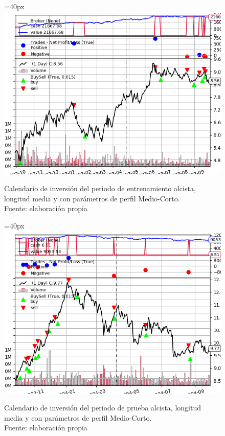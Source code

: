      	\begin{figure}[H]
     		\centering\leftskip=40px
     		\includegraphics[scale=0.66]{imagenes/M_Large-Medium_train.png}
     		\caption[Calendario de inversi\'on del periodo de entrenamiento largo.]{Calendario de inversi\'on del periodo de entrenamiento alcista, longitud media y con par\'ametros de perfil Medio-Corto.\\ Fuente: elaboraci\'on propia}
     		\label{fig:medium_period_mtrain}
     	\end{figure}
     	
     	\begin{figure}[H]
     		\centering\leftskip=40px
     		\includegraphics[scale=0.66]{imagenes/M_Large-Medium_test.png}
     		\caption[Calendario de inversi\'on del periodo de prueba medio]{Calendario de inversi\'on del periodo de prueba alcista, longitud media y con par\'ametros de perfil Medio-Corto.\\ Fuente: elaboraci\'on propia}
     		\label{fig:medium_period_mtest}
     	\end{figure} 

